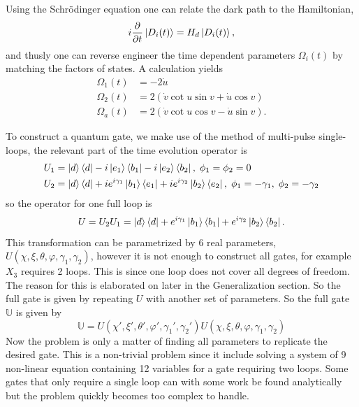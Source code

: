 Using the Schrödinger equation one can relate the dark path to the Hamiltonian,
\begin{equation}
i\pdv{}{t}\ket{D_i(t)} = H_d\ket{D_i(t)},
\end{equation}
and thusly one can reverse engineer the time dependent parameters $\Omega_i(t)$ by matching the factors of states. A calculation yields 
\begin{equation}
\begin{aligned}
\Omega_1(t) &= -2\dot{u}
\\ 
\Omega_2(t) &= 2\left(\dot{v}\cot u\sin v + \dot{u}\cos v \right)
\\
\Omega_a(t) &= 2\left(\dot{v}\cot u\cos v - \dot{u}\sin v \right).
\end{aligned}
\end{equation}

To construct a quantum gate, we make use of the method of multi-pulse single-loops\cite{sLoop}, the relevant part of the time evolution operator is
\begin{equation}
\begin{aligned}&
U_1 = \ket{d}\bra{d} -i\ket{e_1}\bra{b_1} -i\ket{e_2}\bra{b_2},\; \phi_1 = \phi_2 = 0
\\&
U_2 = \ket{d}\bra{d} +ie^{i\gamma_1}\ket{b_1}\bra{e_1} +ie^{i\gamma_2}\ket{b_2}\bra{e_2},\; \phi_1 = -\gamma_1,\; \phi_2 = -\gamma_2
\end{aligned}
\end{equation}
so the operator for one full loop is 
\begin{equation}
\label{eq:trit-gate-1-loop}
U = U_2U_1 = \ket{d}\bra{d} + e^{i\gamma_1}\ket{b_1}\bra{b_1} + e^{i\gamma_2}\ket{b_2}\bra{b_2}.
\end{equation}
This transformation can be parametrized by $6$ real parameters, $U(\chi,\xi,\theta,\varphi,\gamma_1,\gamma_2)$, however it is not enough to construct all gates, for example $X_3$ requires 2 loops. This is since one loop does not cover all degrees of freedom. The reason for this is elaborated on later in the Generalization section. So the full gate is given by repeating $U$ with another set of parameters. So the full gate $\mathbb{U}$ is given by 
\begin{equation}
\label{eq:trit-gate-2-loop}
\mathbb{U} = U(\chi',\xi',\theta',\varphi',\gamma_1',\gamma_2') U(\chi,\xi,\theta,\varphi,\gamma_1,\gamma_2)
\end{equation}
Now the problem is only a matter of finding all parameters to replicate the desired gate. This is a non-trivial problem since it include solving a system of 9 non-linear equation containing 12 variables for a gate requiring two loops. Some gates that only require a single loop can with some work be found analytically but the problem quickly becomes too complex to handle.

